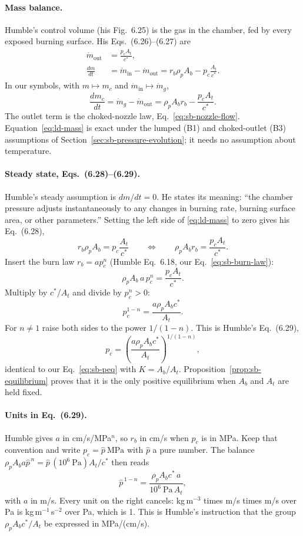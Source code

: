 \paragraph{Mass balance.} Humble's control volume (his Fig.~6.25)
is the gas in the chamber, fed by every exposed burning surface. His
Eqs.~(6.26)--(6.27) are
\begin{align*}
 \dot m_{\mathrm{out}}&=\frac{p_cA_t}{c^*},\\
 \frac{dm}{dt}&=\dot m_{\mathrm{in}}-\dot m_{\mathrm{out}}
            =r_b\rho_pA_b-p_c\frac{A_t}{c^*}.
\end{align*}
In our symbols, with $m\mapsto m_c$ and
$\dot m_{\mathrm{in}}\mapsto\dot m_g$,
\begin{equation}\label{eq:ld-mass}
 \frac{dm_c}{dt}=\dot m_g-\dot m_{\mathrm{out}}
 =\rho_pA_b r_b-\frac{p_cA_t}{c^*}.
\end{equation}
The outlet term is the choked-nozzle law, Eq.~\eqref{eq:sb-nozzle-flow}.
Equation~\eqref{eq:ld-mass} is exact under the lumped (B1) and
choked-outlet (B3) assumptions of Section~\ref{sec:sb-pressure-evolution};
it needs no assumption about temperature.

\paragraph{Steady state, Eqs.~(6.28)--(6.29).}
Humble's steady assumption is $dm/dt=0$. He states its meaning:
``the chamber pressure adjusts instantaneously to any changes in
burning rate, burning surface area, or other parameters.''
Setting the left side of \eqref{eq:ld-mass} to zero gives his
Eq.~(6.28),
\[
 r_b\rho_pA_b=p_c\frac{A_t}{c^*}
 \qquad\Longleftrightarrow\qquad
 \rho_pA_b r_b=\frac{p_cA_t}{c^*}.
\]
Insert the burn law $r_b=ap_c^n$ (Humble Eq.~6.18, our
Eq.~\eqref{eq:sb-burn-law}):
\[
 \rho_pA_b\,a\,p_c^n=\frac{p_cA_t}{c^*}.
\]
Multiply by $c^*/A_t$ and divide by $p_c^n>0$:
\[
 p_c^{1-n}=\frac{a\rho_pA_bc^*}{A_t}.
\]
For $n\neq1$ raise both sides to the power $1/(1-n)$. This is Humble's
Eq.~(6.29),
\begin{equation}\label{eq:ld-psteady}
 p_c=\left(\frac{a\rho_pA_bc^*}{A_t}\right)^{1/(1-n)},
\end{equation}
identical to our Eq.~\eqref{eq:sb-peq} with $K=A_b/A_t$.
Proposition~\ref{prop:sb-equilibrium} proves that it is the only
positive equilibrium when $A_b$ and $A_t$ are held fixed.

\paragraph{Units in Eq.~(6.29).} Humble gives $a$ in
cm/s/MPa$^n$, so $r_b$ in cm/s when $p_c$ is in MPa. Keep that
convention and write $p_c=\hat p\ \mathrm{MPa}$ with $\hat p$ a pure
number. The balance $\rho_pA_ba\hat p^{\,n}=\hat p\,(10^6\
\mathrm{Pa})A_t/c^*$ then reads
\[
 \hat p^{\,1-n}
 =\frac{\rho_pA_bc^*\,a}{10^6\ \mathrm{Pa}\,A_t},
\]
with $a$ in m/s. Every unit on the right cancels: kg\,m$^{-3}$ times
m/s times m/s over Pa is kg\,m$^{-1}$\,s$^{-2}$ over Pa, which is 1.
This is Humble's instruction that the group
$\rho_pA_bc^*/A_t$ be expressed in MPa/(cm/s).

